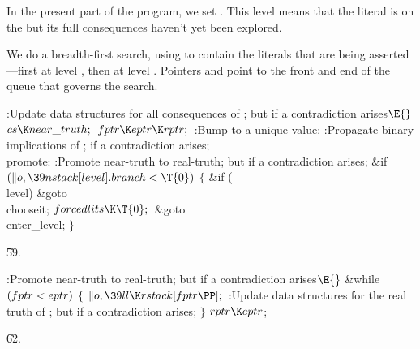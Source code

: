 In the present part of the program, we set . This
level means that the literal is on the  but its full
consequences
haven't yet been explored.

We do a breadth-first search, using  to contain the
literals that are being asserted---first at level ,
then at level . Pointers  and 
point to the front
and end of the queue that governs the search.

\Y\B\4:Update data structures for all consequences of ; but  if a contradiction arises\X${}\E{}$\6
$\\{cs}\K\\{near\_truth};{}$\6
${}\\{fptr}\K\\{eptr}\K\\{rptr};{}$\6
:Bump  to a unique value\X;\6
:Propagate binary implications of ;  if a
contradiction arises\X;\6
\4\\{promote}:\5
:Promote near-truth to real-truth; but  if a
contradiction arises\X;\6
\&{if} ${}(\|o,\39\\{nstack}[\\{level}].\\{branch}<\T{0}){}$\5
${}\{{}$\1\6
\&{if} (\\{level})\1\5
\&{goto} \\{chooseit};\2\6
${}\\{forcedlits}\K\T{0};{}$\6
\&{goto} \\{enter\_level};\6
\4${}\}{}$\2\par
\U59.\fi

\B{}:Promote near-truth to real-truth; but  if a contradiction arises\X${}\E{}$\6
\&{while} ${}(\\{fptr}<\\{eptr}){}$\5
${}\{{}$\1\6
${}\|o,\39\\{ll}\K\\{rstack}[\\{fptr}\PP];{}$\6
:Update data structures for the real truth of ; but  if a contradiction arises\X;\6
\4${}\}{}$\2\6
${}\\{rptr}\K\\{eptr}{}$;\par
\U62.\fi

